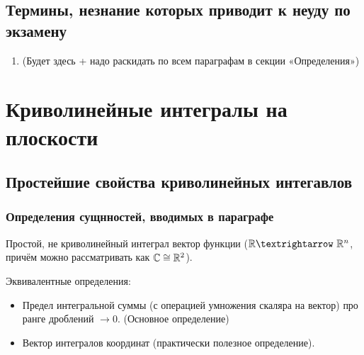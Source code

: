 \documentclass[12pt, a4paper, oneside]{memoir}
\begin{document}
\section{Термины, незнание которых приводит к неуду по экзамену}

\begin{enumerate}
    \item <Дофига всего> (Будет здесь + надо раскидать по всем параграфам в секции «Определения»)
\end{enumerate}


\chapter{Криволинейные интегралы на плоскости}

\section{Простейшие свойства криволинейных интегавлов}

\subsection{Определения сущнностей, вводимых в параграфе}

\begin{definition}
    
    Простой, не криволинейный интеграл вектор функции ($\sR → \sR^n$, причём можно рассматривать как ${\mathbb{C}} \cong {\mathbb{R}}^2$).

    Эквивалентные определения:
    \begin{itemize}
        \item Предел интегральной суммы (с операцией умножения скаляра на вектор) про ранге дроблений $→ 0$. (Основное определение)
        \item Вектор интегралов координат (практически полезное определение).
    \end{itemize}
\end{definition}
\end{document}

